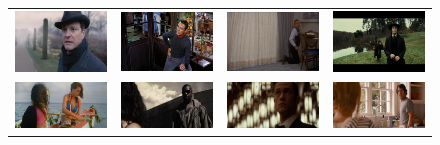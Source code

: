 \begin{figure}
\begin{center}
\begin{tabular}{cccc}
\includegraphics[width=0.15\linewidth]
  {fig/pos/08.jpg} 
& \includegraphics[width=0.15\linewidth]
  {fig/pos/02.jpg}  
& \includegraphics[width=0.15\linewidth]
  {fig/pos/12.jpg}   
& \includegraphics[width=0.15\linewidth]
  {fig/pos/11.jpg}
\\
\includegraphics[width=0.15\linewidth]
  {fig/pos/05.jpg} 
& \includegraphics[width=0.15\linewidth]
  {fig/pos/06.jpg}  
& \includegraphics[width=0.15\linewidth]
  {fig/pos/07.jpg}   
& \includegraphics[width=0.15\linewidth]
  {fig/pos/01.jpg}
\\


\end{tabular}
\end{center}
\end{figure}
